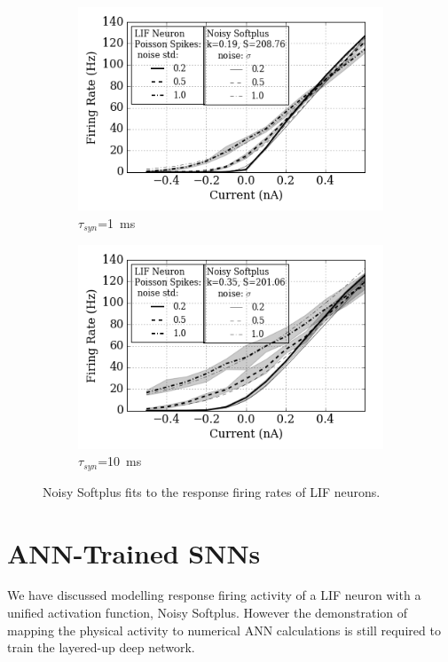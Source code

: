 \documentclass[runningheads,a4paper]{llncs}
\begin{document}
\begin{figure}
	\centering
	\begin{subfigure}[t]{0.49\textwidth}
		\includegraphics[width=\textwidth]{4-1.png}
		\caption{$\tau_{syn}$=1~ms}
	\end{subfigure}
	\begin{subfigure}[t]{0.49\textwidth}
		\includegraphics[width=\textwidth]{4-10.png}
		\caption{$\tau_{syn}$=10~ms}
	\end{subfigure}
	\caption{Noisy Softplus fits to the response firing rates of LIF neurons.}
	\label{Fig:nsptau1}
\end{figure}		


\section{ANN-Trained SNNs}
\label{sec:ann_train_snn}
We have discussed modelling response firing activity of a LIF neuron with a unified activation function, Noisy Softplus.
However the demonstration of mapping the physical activity to numerical ANN calculations is still required to train the layered-up deep network.
\end{document}
